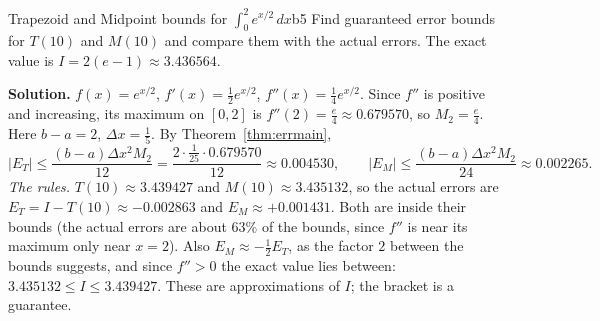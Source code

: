 \documentclass[11pt]{article}
\begin{document}
\begin{exmp}{Trapezoid and Midpoint bounds for $\int_0^2e^{x/2}\,dx$}{b5}
Find guaranteed error bounds for $T(10)$ and $M(10)$ and compare them with the actual errors. The exact value is $I=2(e-1)\approx3.436564$.

\textbf{Solution.} $f(x)=e^{x/2}$, $f'(x)=\frac12e^{x/2}$, $f''(x)=\frac14e^{x/2}$. Since $f''$ is positive and increasing, its maximum on $[0,2]$ is $f''(2)=\frac e4\approx0.679570$, so $M_2=\frac e4$. Here $b-a=2$, $\Delta x=\frac15$. By Theorem~\ref{thm:errmain},
\[\lvert E_T\rvert\le\frac{(b-a)\Delta x^2M_2}{12}=\frac{2\cdot\frac1{25}\cdot0.679570}{12}\approx0.004530,\qquad\lvert E_M\rvert\le\frac{(b-a)\Delta x^2M_2}{24}\approx0.002265 .\]
\emph{The rules.} $T(10)\approx3.439427$ and $M(10)\approx3.435132$, so the actual errors are $E_T=I-T(10)\approx-0.002863$ and $E_M\approx+0.001431$. Both are inside their bounds (the actual errors are about $63\%$ of the bounds, since $f''$ is near its maximum only near $x=2$). Also $E_M\approx-\frac12E_T$, as the factor $2$ between the bounds suggests, and since $f''>0$ the exact value lies between: $3.435132\le I\le3.439427$. These are approximations of $I$; the bracket is a guarantee.
\end{exmp}
\end{document}
